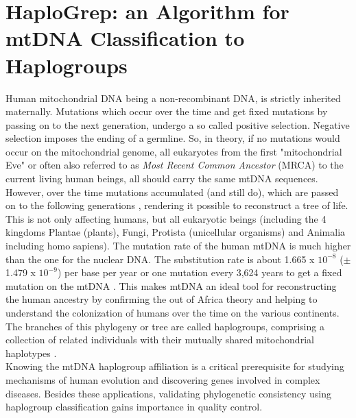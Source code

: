 \chapter{HaploGrep: an Algorithm for mtDNA Classification to Haplogroups}
\label{chapterHaplogrep}
Human mitochondrial DNA being a non-recombinant DNA, is strictly inherited maternally. Mutations which occur over the time and get fixed mutations by passing on to the next generation, undergo a so called positive selection. Negative selection imposes the ending of a germline. So, in theory, if no mutations would occur on the mitochondrial genome, all eukaryotes from the first "mitochondrial Eve" or often also referred to as \textit{Most Recent Common Ancestor} (MRCA) to the current living human beings, all should carry the same mtDNA sequences. However, over the time mutations accumulated (and still do), which are passed on to the following generations \cite{Stewart2014}, rendering it possible to reconstruct a tree of life. This is not only affecting humans, but all eukaryotic beings (including the 4 kingdoms Plantae (plants), Fungi, Protista (unicellular organisms) and Animalia including homo sapiens). The mutation rate of the human mtDNA is much higher than the one for the nuclear DNA. The substitution rate is about 1.665 x $10^{-8}$ ($\pm$ 1.479 x $10^{-9}$) per base per year or one mutation every 3,624 years to get a fixed mutation on the mtDNA \cite{Soares2009}. This makes mtDNA an ideal tool for reconstructing the human ancestry by confirming the out of Africa theory and helping to understand the colonization of humans over the time on the various continents. The branches of this phylogeny or tree are called haplogroups, comprising a collection of related individuals with their mutually shared mitochondrial haplotypes \cite{Scally2012}. \\
Knowing the mtDNA haplogroup affiliation is a critical prerequisite \cite{Kloss-Brandstatter2011} for studying mechanisms of human evolution and discovering genes involved in complex diseases. Besides these applications, validating phylogenetic consistency using haplogroup classification gains importance in quality control. 

